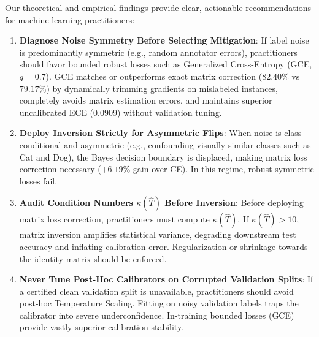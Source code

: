 \documentclass[10pt,twocolumn]{article}
\theoremstyle{definition}
\begin{document}
Our theoretical and empirical findings provide clear, actionable recommendations for machine learning practitioners:
\begin{enumerate}
    \item \textbf{Diagnose Noise Symmetry Before Selecting Mitigation}: If label noise is predominantly symmetric (e.g., random annotator errors), practitioners should favor bounded robust losses such as Generalized Cross-Entropy (GCE, $q=0.7$). GCE matches or outperforms exact matrix correction ($82.40\%$ vs $79.17\%$) by dynamically trimming gradients on mislabeled instances, completely avoids matrix estimation errors, and maintains superior uncalibrated ECE ($0.0909$) without validation tuning.
    \item \textbf{Deploy Inversion Strictly for Asymmetric Flips}: When noise is class-conditional and asymmetric (e.g., confounding visually similar classes such as Cat and Dog), the Bayes decision boundary is displaced, making matrix loss correction necessary ($+6.19\%$ gain over CE). In this regime, robust symmetric losses fail.
    \item \textbf{Audit Condition Numbers $\kappa(\hat{T})$ Before Inversion}: Before deploying matrix loss correction, practitioners must compute $\kappa(\hat{T})$. If $\kappa(\hat{T}) > 10$, matrix inversion amplifies statistical variance, degrading downstream test accuracy and inflating calibration error. Regularization or shrinkage towards the identity matrix should be enforced.
    \item \textbf{Never Tune Post-Hoc Calibrators on Corrupted Validation Splits}: If a certified clean validation split is unavailable, practitioners should avoid post-hoc Temperature Scaling. Fitting on noisy validation labels traps the calibrator into severe underconfidence. In-training bounded losses (GCE) provide vastly superior calibration stability.
\end{enumerate}
\end{document}
